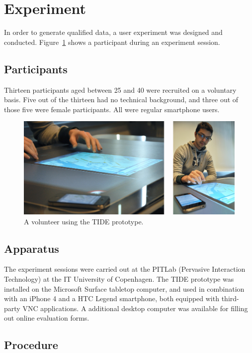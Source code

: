 \section{Experiment}
\label{sec:experiment}

In order to generate qualified data, a user experiment was designed and conducted.
Figure~\ref{fig:andrea} shows a participant during an experiment session.

\subsection{Participants}

Thirteen participants aged between 25 and 40 were recruited on a voluntary basis.
Five out of the thirteen had no technical background, and three out of those five were female participants.
All were regular smartphone users.

\begin{figure}[htb]
  \centering
    \includegraphics[width=1\textwidth]{images/tideandrea}
    \caption{A volunteer using the TIDE prototype.}
    \label{fig:andrea}
\end{figure}

\subsection{Apparatus}

The experiment sessions were carried out at the PITLab (Pervasive Interaction Technology) at the IT University of Copenhagen.
The TIDE prototype was installed on the Microsoft Surface tabletop computer, and used in combination with an iPhone 4 and a HTC Legend smartphone, both equipped with third-party VNC applications.
A additional desktop computer was available for filling out online evaluation forms.

\subsection{Procedure}


